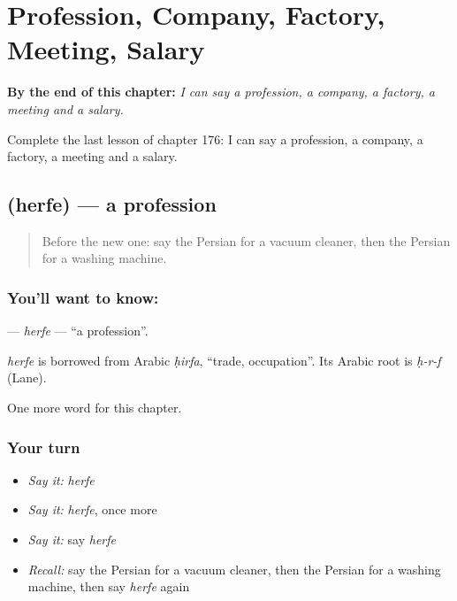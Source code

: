 
\chapter{Profession, Company, Factory, Meeting, Salary}
\label{ch:fa-profession-company-factory-meeting-salary}

\begin{chapteropening}
\textbf{By the end of this chapter:} \emph{I can say a profession, a company, a factory, a meeting and a salary.}

Complete the last lesson of chapter 176: I can say a profession, a company, a factory, a meeting and a salary.
\end{chapteropening}

\section[\texorpdfstring{\fa{حرفه} (herfe)}{حرفه (herfe)}]{ (herfe) — a profession}

\label{lesson:FA-C176-herfe}



\begin{quote}
Before the new one: say the Persian for a vacuum cleaner, then the Persian for a washing machine.
\end{quote}

\subsection*{You'll want to know: }
\textbf{} — \emph{herfe} — \textquotedblleft{}a profession\textquotedblright{}.

\begin{cousinweb}
\emph{herfe} is borrowed from Arabic \emph{ḥirfa}, \textquotedblleft{}trade, occupation\textquotedblright{}. Its Arabic root is \emph{ḥ-r-f} (Lane).
\end{cousinweb}

\begin{grammarlens}[title={What you've built}]
One more word for this chapter.
\end{grammarlens}

\subsection*{Your turn}
\begin{itemize}
\raggedright
  \item \emph{Say it:} \emph{herfe}
  \item \emph{Say it:} \emph{herfe}, once more
  \item \emph{Say it:} say \emph{herfe}
  \item \emph{Recall:} say the Persian for a vacuum cleaner, then the Persian for a washing machine, then say \emph{herfe} again
\end{itemize}

